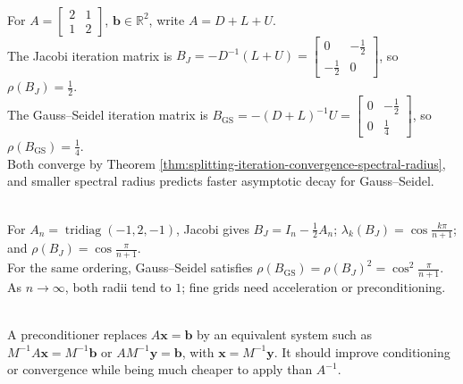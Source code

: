 \begin{example} \label{ex:two-by-two-jacobi-gauss-seidel-convergence} \\
For $A=\begin{bmatrix}2&1\\1&2\end{bmatrix}$, $\mathbf{b}\in\mathbb{R}^2$, write $A=D+L+U$.\\
The Jacobi iteration matrix is $B_J=-D^{-1}(L+U)= \begin{bmatrix} 0&-\frac12\\ -\frac12&0 \end{bmatrix}$, so $\rho(B_J)=\frac12$.\\
The Gauss--Seidel iteration matrix is $B_{\operatorname{GS}}=-(D+L)^{-1}U= \begin{bmatrix} 0&-\frac12\\ 0&\frac14 \end{bmatrix}$, so $\rho(B_{\operatorname{GS}})=\frac14$.\\
Both converge by Theorem \ref{thm:splitting-iteration-convergence-spectral-radius}, and smaller spectral radius predicts faster asymptotic decay for Gauss--Seidel.
\end{example}

\begin{example} \label{ex:poisson-tridiagonal-stationary-rates} \\
For $A_n=\operatorname{tridiag}(-1,2,-1)$, Jacobi gives $B_J=I_n-\frac12A_n$; $\lambda_k(B_J)=\cos\frac{k\pi}{n+1}$; and $\rho(B_J)=\cos\frac{\pi}{n+1}$.\\
For the same ordering, Gauss--Seidel satisfies $\rho(B_{\operatorname{GS}})=\rho(B_J)^2=\cos^2\frac{\pi}{n+1}$.
As $n\to\infty$, both radii tend to $1$; fine grids need acceleration or preconditioning.
\end{example}

\begin{perspective} \label{per:preconditioning-preview} \\
A preconditioner replaces $A\mathbf{x}=\mathbf{b}$ by an equivalent system such as $M^{-1}A\mathbf{x}=M^{-1}\mathbf{b}$ or $AM^{-1}\mathbf{y}=\mathbf{b}$, with $\mathbf{x}=M^{-1}\mathbf{y}$. It should improve conditioning or convergence while being much cheaper to apply than $A^{-1}$.
\end{perspective}
